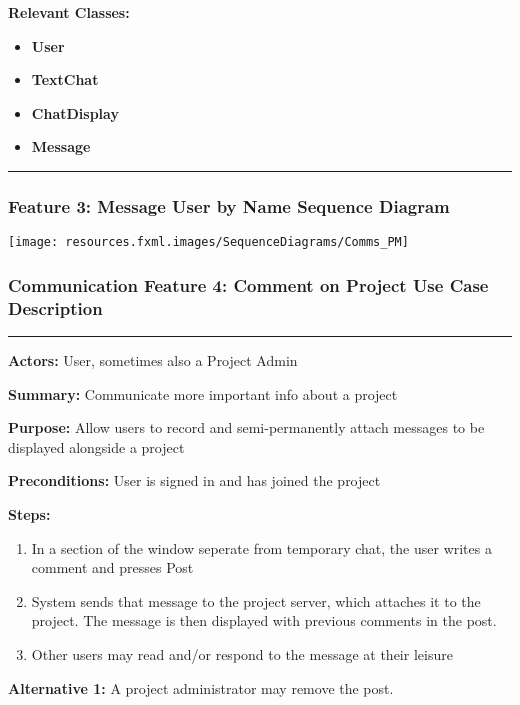 \documentclass[twoside,letterpaper]{article}
\begin{document}
\noindent\textbf{Relevant Classes:}
\begin{itemize}
	\item \textbf{User}
	\item \textbf{TextChat}
	\item \textbf{ChatDisplay}
	\item \textbf{Message}
\end{itemize}
\hrule
\newpage

\subsubsection[Communication Feature 3: Message User by Name Sequence Diagram]{\rmfamily\bfseries\color{black}
	Feature 3: Message User by Name Sequence Diagram}
\hypertarget{RefHeading22059017292}{}

\bigskip

\texttt{[image: resources.fxml.images/SequenceDiagrams/Comms\_PM]}

\newpage

\subsubsection[Communication Feature 4: Comment on Project Use Case Description]{\rmfamily\bfseries\color{black}
	Communication Feature 4: Comment on Project Use Case Description}
\hypertarget{RefHeading22059017292}{}

\vspace{2pt}
\hrule
\vspace{8pt}
\textbf{Actors:} User, sometimes also a Project Admin \newline

\noindent\textbf{Summary:} Communicate more important info about a project  \newline

\noindent\textbf{Purpose:} Allow users to record and semi-permanently attach messages to be displayed alongside a project \newline

\noindent\textbf{Preconditions:} User is signed in and has joined the project \newline

\noindent\textbf{Steps:} \begin{enumerate}
	\item In a section of the window seperate from temporary chat, the user writes a comment and presses Post
	\item System sends that message to the project server, which attaches it to the project. The message is then displayed with previous comments in the post.
	\item Other users may read and/or respond to the message at their leisure
\end{enumerate}
\noindent\textbf{Alternative 1:} A project administrator may remove the post. \newline
\end{document}
